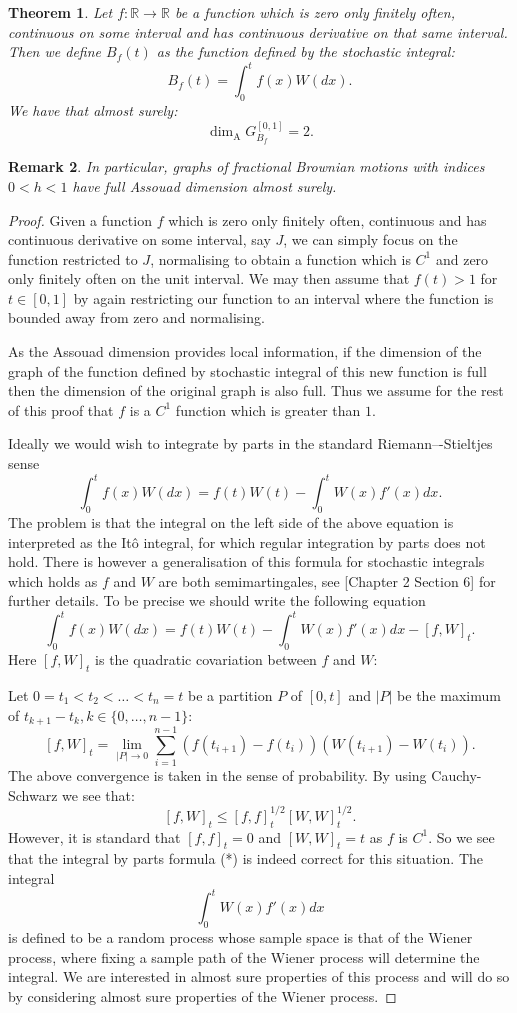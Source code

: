 \documentclass{amsart}
\newcommand{\Assouad}{\dim_{\mathrm{A}}}
\newtheorem{thm}{Theorem}[section]
\newtheorem{rem}[thm]{Remark}
\begin{document}
\begin{thm}
	Let $f:\mathbb{R}\to\mathbb{R}$ be a function which is zero only finitely often, continuous on some interval and has continuous derivative on that same interval. Then we define $B_f(t)$ as the function defined by the stochastic integral:
	\[	
B_f(t)=\int_0^t f(x) W(dx).
	\]
	We have that almost surely:
	\[
		\Assouad G_{B_f}^{[0,1]}=2.
	\]
\end{thm}
\begin{rem}
	In particular, graphs of fractional Brownian motions with indices $0<h<1$ have full Assouad dimension almost surely.
\end{rem}
\begin{proof}
	Given a function $f$ which is zero only finitely often, continuous and has continuous derivative on some interval, say $J$, we can simply focus on the function restricted to $J$, normalising to obtain a function which is $C^1$ and zero only finitely often on the unit interval. We may then assume that $f(t)>1$ for $t\in [0,1]$ by again restricting our function to an interval where the function is bounded away from zero and normalising. 
    
    As the Assouad dimension provides local information, if the dimension of the graph of the function defined by stochastic integral of this new function is full then the dimension of the original graph is also full. Thus we assume for the rest of this proof that $f$ is a $C^1$ function which is greater than $1$.

Ideally we would wish to integrate by parts in the standard Riemann–-Stieltjes sense
\[
\int_{0}^{t}f(x)W(dx)=f(t)W(t)-\int_{0}^{t}W(x)f'(x)dx.\tag{*}
\]
The problem is that the integral on the left side of the above equation is interpreted as the It\^{o} integral, for which regular integration by parts does not hold. There is however a generalisation of this formula for stochastic integrals which holds as $f$ and $W$ are both semimartingales, see \cite{Pr}[Chapter 2 Section 6] for further details. To be precise we should write the following equation
\[
\int_{0}^{t}f(x)W(dx)=f(t)W(t)-\int_{0}^{t}W(x)f'(x)dx-[f,W]_t.
\]
Here $[f,W]_t$ is the quadratic covariation between $f$ and $W$:

Let $0=t_1<t_2<\dots<t_n=t$ be a partition $P$ of $[0,t]$ and $\vert P \vert$ be the maximum of $t_{k+1}-t_k,k\in\{0,\dots,n-1\}$:
\[
[f,W]_t=\lim_{\vert P\vert\to 0} \sum_{i=1}^{n-1} (f(t_{i+1})-f(t_{i}))(W(t_{i+1})-W(t_i)).
\]
The above convergence is taken in the sense of probability. By using Cauchy-Schwarz we see that:
\[
[f,W]_t\leq [f,f]^{1/2}_t[W,W]^{1/2}_t.
\]
However, it is standard that $[f,f]_t=0$ and $[W,W]_t=t$ as $f$ is $C^1$. So we see that the integral by parts formula (*) is indeed correct for this situation. The integral 
\[
\int_0^{t} W(x)f'(x)dx
\]
is defined to be a random process whose sample space is that of the Wiener process, where fixing a sample path of the Wiener process will determine the integral. We are interested in almost sure properties of this process and will do so by considering almost sure properties of the Wiener process.
  	

\end{proof}
\end{document}
